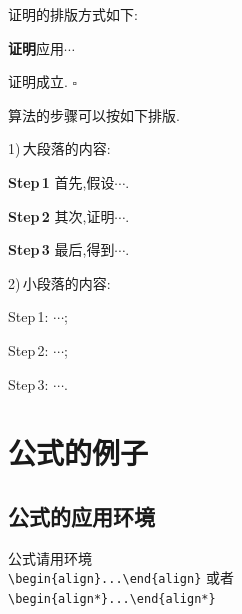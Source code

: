 \documentclass{ctacn}%
\begin{document}
\begin{multicols}{2}







证明的排版方式如下:

\textbf{证明}\quad 应用$\cdots$

证明成立. {\Large$\square$}

算法的步骤可以按如下排版.

1)\,大段落的内容:

\textbf{Step\,1}\quad
首先,假设$\cdots$.

\textbf{Step\,2}\quad
其次,证明$\cdots$.

\textbf{Step\,3}\quad
最后,得到$\cdots$.

2)\,小段落的内容:

Step\,1: $\cdots$;

Step\,2: $\cdots$;

Step\,3: $\cdots$.


\section{公式的例子}
\subsection{公式的应用环境}
公式请用环境\\
\verb|\begin{align}...\end{align}|
或者\\
\verb|\begin{align*}...\end{align*}|%

\end{multicols}
\end{document}
